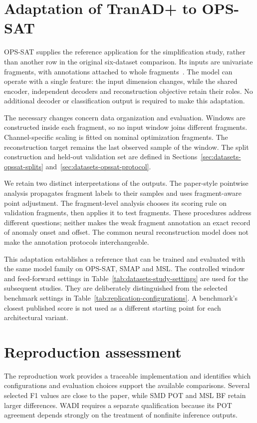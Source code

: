 \section{Adaptation of TranAD+ to OPS-SAT}
\label{sec:replication-opssat}
\ac{OPS-SAT} supplies the reference application for the simplification
study, rather than another row in the original six-dataset comparison.
Its inputs are univariate fragments, with annotations attached to whole
fragments~\cite{Ruszczak2025OPSSAT}. The model can operate with a single
feature: the input dimension changes, while the shared encoder,
independent decoders and reconstruction objective retain their roles.
No additional decoder or classification output is required to make this
adaptation.

The necessary changes concern data organization and evaluation. Windows
are constructed inside each fragment, so no input window joins different
fragments. Channel-specific scaling is fitted on nominal optimization
fragments. The reconstruction target remains the last observed sample
of the window. The split construction and held-out validation set are
defined in Sections~\ref{sec:datasets-opssat-splits}
and~\ref{sec:datasets-opssat-protocol}.

We retain two distinct interpretations of the outputs. The paper-style
pointwise analysis propagates fragment labels to their samples and uses
fragment-aware point adjustment. The fragment-level analysis chooses
its scoring rule on validation fragments, then applies it to test
fragments. These procedures address different questions; neither makes
the weak fragment annotation an exact record of anomaly onset and offset.
The common neural reconstruction model does not make the annotation
protocols interchangeable.

This adaptation establishes a reference that can be trained and evaluated
with the same model family on \ac{OPS-SAT}, \ac{SMAP} and \ac{MSL}.
The controlled window and feed-forward settings in
Table~\ref{tab:datasets-study-settings} are used for the subsequent studies.
They are deliberately distinguished from the selected benchmark settings
in Table~\ref{tab:replication-configurations}. A benchmark's closest
published score is not used as a different starting point for each
architectural variant.

\section{Reproduction assessment}
\label{sec:replication-assessment}
The reproduction work provides a traceable implementation and identifies
which configurations and evaluation choices support the available
comparisons. Several selected F1 values are close to the paper, while
\ac{SMD} \ac{POT} and \ac{MSL} BF retain larger differences. WADI
requires a separate qualification because its \ac{POT} agreement depends
strongly on the treatment of nonfinite inference outputs.

